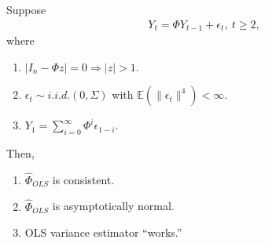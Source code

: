 \documentclass[11pt]{elegantbook}
\begin{document}
\begin{proposition}
    Suppose
    \begin{equation}
        \begin{aligned}
            Y_t=\Phi Y_{t-1} + \epsilon_t, \ t\geq 2,
        \end{aligned}
        \nonumber
    \end{equation}
    where
    \begin{enumerate}
        \item $|I_n-\Phi z|=0 \Rightarrow |z|>1$.
        \item $\epsilon_t\sim{i.i.d.}(0,\Sigma)$ with $\mathbb{E}(\|\epsilon_t\|^4)<\infty$.
        \item $Y_1=\sum_{i=0}^\infty \Phi^i\epsilon_{1-i}$.
    \end{enumerate}
    Then,
    \begin{enumerate}
        \item $\hat{\Phi}_{OLS}$ is consistent.
        \item $\hat{\Phi}_{OLS}$ is asymptotically normal.
        \item OLS variance estimator ``works.''
    \end{enumerate}
\end{proposition}
\end{document}
